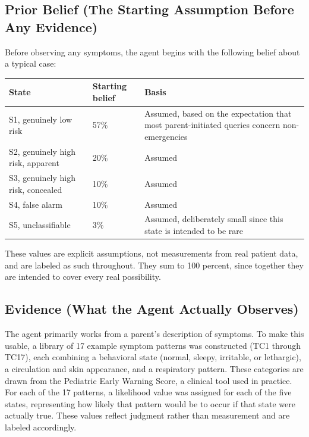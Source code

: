 \documentclass{article}
\begin{document}
\hypertarget{prior-belief-the-starting-assumption-before-any-evidence}{%
\subsection{Prior Belief (The Starting Assumption Before Any
Evidence)}\label{prior-belief-the-starting-assumption-before-any-evidence}}

Before observing any symptoms, the agent begins with the following
belief about a typical case:

\begin{table}[t]
\centering\small
\begin{tabular}{@{}p{}p{}p{}@{}}
\toprule
\textbf{State} & \textbf{Starting belief} & \textbf{Basis} \\
\midrule
S1, genuinely low risk & 57\% & Assumed, based on the expectation that most parent-initiated queries concern non-emergencies \\
S2, genuinely high risk, apparent & 20\% & Assumed \\
S3, genuinely high risk, concealed & 10\% & Assumed \\
S4, false alarm & 10\% & Assumed \\
S5, unclassifiable & 3\% & Assumed, deliberately small since this state is intended to be rare \\
\bottomrule
\end{tabular}
\end{table}

These values are explicit assumptions, not measurements from real
patient data, and are labeled as such throughout. They sum to 100
percent, since together they are intended to cover every real
possibility.

\hypertarget{evidence-what-the-agent-actually-observes}{%
\subsection{Evidence (What the Agent Actually
Observes)}\label{evidence-what-the-agent-actually-observes}}

The agent primarily works from a parent's description of symptoms. To
make this usable, a library of 17 example symptom patterns was
constructed (TC1 through TC17), each combining a behavioral state
(normal, sleepy, irritable, or lethargic), a circulation and skin
appearance, and a respiratory pattern. These categories are drawn from
the Pediatric Early Warning Score, a clinical tool used in practice. For
each of the 17 patterns, a likelihood value was assigned for each of the
five states, representing how likely that pattern would be to occur if
that state were actually true. These values reflect judgment rather than
measurement and are labeled accordingly.
\end{document}
